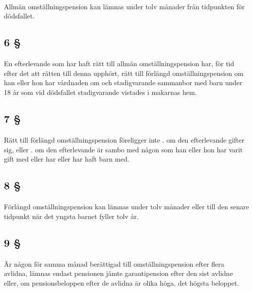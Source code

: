 \documentclass[a4paper,notitlepage,openany,10pt]{book}
\begin{document}
\paragraph*{}
Allmän omställningspension kan lämnas under tolv månader från tidpunkten för dödsfallet.
\subsection*{6 §}
\paragraph*{}
En efterlevande som har haft rätt till allmän omställningspension har, för tid efter det att rätten till denna upphört, rätt till förlängd omställningspension om han eller hon har vårdnaden om och stadigvarande sammanbor med barn under 18 år som vid dödsfallet stadigvarande vistades i makarnas hem.
\subsection*{7 §}
\paragraph*{}
Rätt till förlängd omställningspension föreligger inte
. om den efterlevande gifter sig, eller
. om den efterlevande är sambo med någon som han eller hon har varit gift med eller har eller har haft barn med.
\subsection*{8 §}
\paragraph*{}
Förlängd omställningspension kan lämnas under tolv månader eller till den senare tidpunkt när det yngsta barnet fyller tolv år.
\subsection*{9 §}
\paragraph*{}
Är någon för samma månad berättigad till omställningspension efter flera avlidna, lämnas endast pensionen jämte garantipension efter den sist avlidne eller, om pensionsbeloppen efter de avlidna är olika höga, det högsta beloppet.
\end{document}
